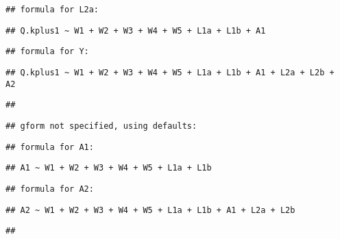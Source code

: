 \documentclass[
]{article}
\begin{document}
\begin{verbatim}
## formula for L2a:
\end{verbatim}

\begin{verbatim}
## Q.kplus1 ~ W1 + W2 + W3 + W4 + W5 + L1a + L1b + A1
\end{verbatim}

\begin{verbatim}
## formula for Y:
\end{verbatim}

\begin{verbatim}
## Q.kplus1 ~ W1 + W2 + W3 + W4 + W5 + L1a + L1b + A1 + L2a + L2b +     A2
\end{verbatim}

\begin{verbatim}
## 
\end{verbatim}

\begin{verbatim}
## gform not specified, using defaults:
\end{verbatim}

\begin{verbatim}
## formula for A1:
\end{verbatim}

\begin{verbatim}
## A1 ~ W1 + W2 + W3 + W4 + W5 + L1a + L1b
\end{verbatim}

\begin{verbatim}
## formula for A2:
\end{verbatim}

\begin{verbatim}
## A2 ~ W1 + W2 + W3 + W4 + W5 + L1a + L1b + A1 + L2a + L2b
\end{verbatim}

\begin{verbatim}
## 
\end{verbatim}
\end{document}
